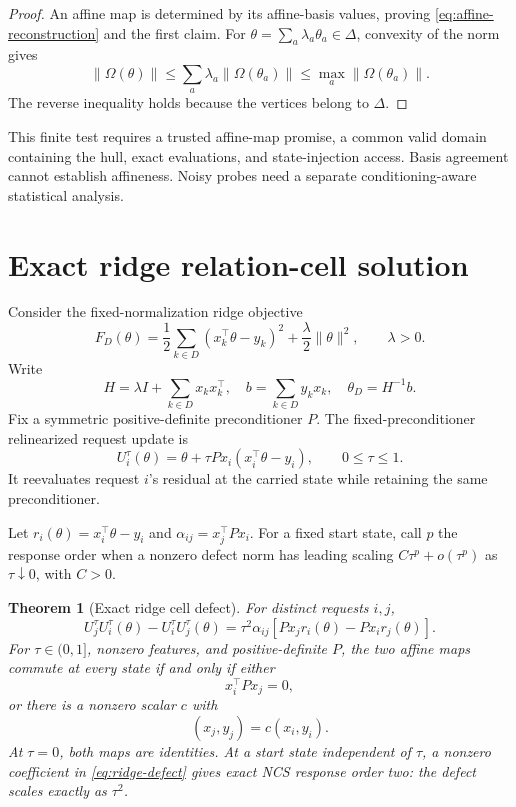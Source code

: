 \documentclass[10pt]{article}
\newtheorem{theorem}{Theorem}[section]
\theoremstyle{definition}
\theoremstyle{remark}
\begin{document}
\begin{proof}
An affine map is determined by its affine-basis values, proving
\eqref{eq:affine-reconstruction} and the first claim. For
\(\theta=\sum_a\lambda_a\theta_a\in\Delta\), convexity of the norm gives
\[
\|\Omega(\theta)\|
\le
\sum_a\lambda_a\|\Omega(\theta_a)\|
\le
\max_a\|\Omega(\theta_a)\|.
\]
The reverse inequality holds because the vertices belong to \(\Delta\).
\end{proof}

This finite test requires a trusted affine-map promise, a common valid domain
containing the hull, exact evaluations, and state-injection access. Basis
agreement cannot establish affineness. Noisy probes need a separate
conditioning-aware statistical analysis.

\section{Exact ridge relation-cell solution}

Consider the fixed-normalization ridge objective
\[
 F_D(\theta)
 =
 \frac12\sum_{k\in D}(x_k^\top\theta-y_k)^2
 +
 \frac\lambda2\|\theta\|^2,
 \qquad \lambda>0.
 \tag{7.1}
\]
Write
\[
 H=\lambda I+\sum_{k\in D}x_kx_k^\top,
 \quad
 b=\sum_{k\in D}y_kx_k,
 \quad
 \theta_D=H^{-1}b.
\]
Fix a symmetric positive-definite preconditioner \(P\). The
fixed-preconditioner relinearized request update is
\[
 U_i^\tau(\theta)
 =
 \theta+\tau P x_i(x_i^\top\theta-y_i),
 \qquad 0\le\tau\le1.
 \tag{7.2}\label{eq:update}
\]
It reevaluates request \(i\)'s residual at the carried state while retaining
the same preconditioner.

Let \(r_i(\theta)=x_i^\top\theta-y_i\) and
\(\alpha_{ij}=x_j^\top Px_i\). For a fixed start state, call \(p\) the
response order when a nonzero defect norm has leading scaling
\(C\tau^p+o(\tau^p)\) as \(\tau\downarrow0\), with \(C>0\).

\begin{theorem}[Exact ridge cell defect]
\label{thm:ridge}
For distinct requests \(i,j\),
\[
\boxed{
U_j^\tau U_i^\tau(\theta)-U_i^\tau U_j^\tau(\theta)
=
\tau^2\alpha_{ij}
\left[
Px_jr_i(\theta)-Px_ir_j(\theta)
\right].
}
\tag{7.3}\label{eq:ridge-defect}
\]
For \(\tau\in(0,1]\), nonzero features, and positive-definite \(P\), the two
affine maps commute at every state if and only if either
\[
x_i^\top Px_j=0,
\tag{7.4}
\]
or there is a nonzero scalar \(c\) with
\[
(x_j,y_j)=c(x_i,y_i).
\tag{7.5}
\]
At \(\tau=0\), both maps are identities. At a start state independent of
\(\tau\), a nonzero coefficient in \eqref{eq:ridge-defect} gives exact NCS
response order two: the defect scales exactly as \(\tau^2\).
\end{theorem}
\end{document}
